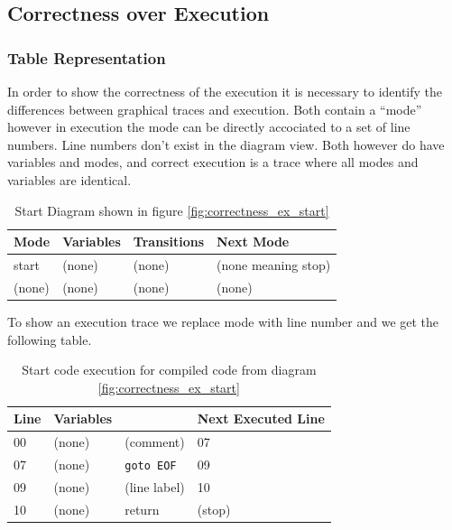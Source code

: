 \subsection{Correctness over Execution}
\subsubsection{Table Representation}

In order to show the correctness of the execution it is necessary to identify the differences between graphical traces and execution. Both contain a ``mode'' however in execution the mode can be directly accociated to a set of line numbers. Line numbers don't exist in the diagram view. Both however do have variables and modes, and correct execution is a trace where all modes and variables are identical.

\begin{table}[htcb]
	\caption{Start Diagram shown in figure \ref{fig:correctness_ex_start}}
	\centering
		\begin{tabular}{| l | l | l | l |}
			\hline
			\textbf{Mode} & \textbf{Variables} & \textbf{Transitions} & \textbf{Next Mode} \\
			\hline
			start & (none) & (none) & (none meaning stop) \\
			\hline
			(none) & (none) & (none) & (none) \\
			\hline
		\end{tabular}
	\label{table:BasicDiagOnly}
\end{table}

To show an execution trace we replace mode with line number and we get the following table.

\begin{table}[htcb]
	\caption{Start code execution for compiled code from diagram \ref{fig:correctness_ex_start}}
	\centering
		\begin{tabular}{| l | l | l | l |}
			\hline
			\textbf{Line} & \textbf{Variables} & \text{Code} & \textbf{Next Executed Line} \\
			\hline
			00 & (none) & (comment) & 07 \\
			\hline
			07 & (none) & \texttt{goto EOF} & 09 \\
			\hline
			09 & (none) & (line label) & 10 \\
			\hline
			10 & (none) & return & (stop) \\
			\hline
		\end{tabular}
	\label{table:BasicExecOnly}
\end{table}

